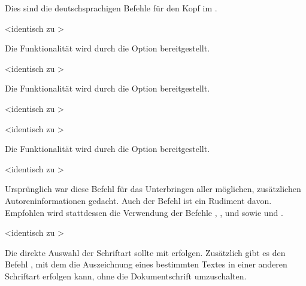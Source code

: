 \begin{DeclareEntity}{}
\begin{Declaration}
\begin{Declaration}
\begin{Declaration}
\begin{Declaration}
Dies sind die deutschsprachigen Befehle für den Kopf im \CD.
\end{Declaration}
\end{Declaration}
\end{Declaration}
\end{Declaration}

\begin{Declaration}
  {}
  <identisch zu >
\printdeclarationlist

Die Funktionalität wird durch die Option  bereitgestellt.
\end{Declaration}

\begin{Declaration}
  {}
  <identisch zu >
\printdeclarationlist

Die Funktionalität wird durch die Option  bereitgestellt.
\end{Declaration}

\begin{Declaration}
  {}
  <identisch zu >
\begin{Declaration}
  {}
  <identisch zu >
\printdeclarationlist

Die Funktionalität wird durch die Option  bereitgestellt.
\end{Declaration}
\end{Declaration}

\begin{Declaration}
  {}
  <identisch zu >
\printdeclarationlist

Ursprünglich war diese Befehl für das Unterbringen aller möglichen, 
zusätzlichen Autoreninformationen gedacht. Auch der Befehl  
ist ein Rudiment davon. Empfohlen wird stattdessen die Verwendung der Befehle 
, ,  und 
 sowie  und .
\end{Declaration}

\begin{Declaration}
  {}
  <identisch zu >
\printdeclarationlist

Die direkte Auswahl der Schriftart sollte mit  erfolgen. 
Zusätzlich gibt es den Befehl , mit dem die Auszeichnung 
eines bestimmten Textes in einer anderen Schriftart erfolgen kann, ohne die 
Dokumentschrift umzuschalten.
\end{Declaration}
%




\end{DeclareEntity}
